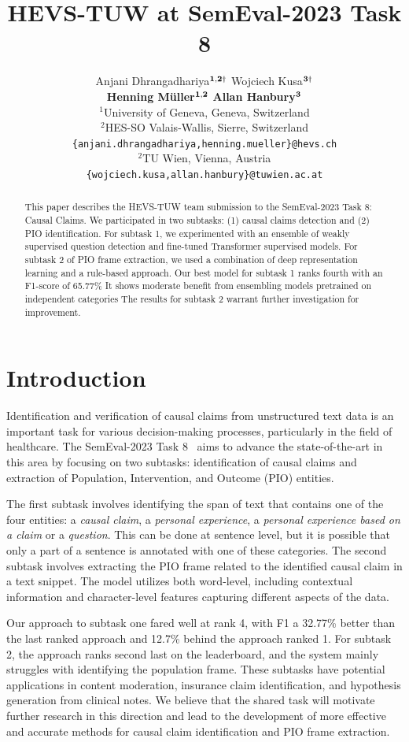 \documentclass[11pt]{article}
\title{HEVS-TUW at SemEval-2023 Task 8}
\author{Anjani Dhrangadhariya\hspace{1pt}$^{{{\bf 1,2}}\dag}$ \hspace{.7cm} Wojciech Kusa\hspace{1pt}$^{{\bf 3}\dag}$ \\[0.15cm] {\bf Henning Müller\hspace{1pt}$^{{\bf 1,2}}$}  \hspace{.7cm}  {\bf Allan Hanbury\hspace{1pt}$^{{\bf 3}}$}
\\[0.4cm]
{$^1$University of Geneva, Geneva, Switzerland} \\
{$^2$HES-SO Valais-Wallis, Sierre, Switzerland} \\
{\tt \{anjani.dhrangadhariya,henning.mueller\}@hevs.ch} \\
{$^2$TU Wien, Vienna, Austria} \\
{\tt \{wojciech.kusa,allan.hanbury\}@tuwien.ac.at} \\
}
\begin{document}
\maketitle
{\let\thefootnote\relax{}}

\begin{abstract}
This paper describes the HEVS-TUW team submission to the SemEval-2023 Task 8: Causal Claims.
We participated in two subtasks: (1) causal claims detection and (2)  PIO identification.
For subtask 1, we experimented with an ensemble of weakly supervised question detection and fine-tuned Transformer supervised models.
For subtask 2 of PIO frame extraction, we used a combination of deep representation learning and a rule-based approach. 
Our best model for subtask 1 ranks fourth with an F1-score of 65.77\% 
It shows moderate benefit from ensembling models pretrained on independent categories
The results for subtask 2 warrant further investigation for improvement.
\end{abstract}

\section{Introduction}

% 
Identification and verification of causal claims from unstructured text data is an important task for various decision-making processes, particularly in the field of healthcare. The SemEval-2023 Task 8~\cite{CausalClaims} aims to advance the state-of-the-art in this area by focusing on two subtasks: identification of causal claims and extraction of Population, Intervention, and Outcome (PIO) entities.

% 
The first subtask involves identifying the span of text that contains one of the four entities: a \emph{causal claim}, a \emph{personal experience}, a \emph{personal experience based on a claim} or a \emph{question}. 
This can be done at sentence level, but it is possible that only a part of a sentence is annotated with one of these categories. 
The second subtask involves extracting the PIO frame related to the identified causal claim in a text snippet.
The model utilizes both word-level, including contextual information and character-level features capturing different aspects of the data.

Our approach to subtask one fared well at rank 4, with F1 a 32.77\% better than the last ranked approach and 12.7\% behind the approach ranked 1.
For subtask 2, the approach ranks second last on the leaderboard, and the system mainly struggles with identifying the population frame.
These subtasks have potential applications in content moderation, insurance claim identification, and hypothesis generation from clinical notes.
We believe that the shared task will motivate further research in this direction and lead to the development of more effective and accurate methods for causal claim identification and PIO frame extraction.
%
%
%
\end{document}

